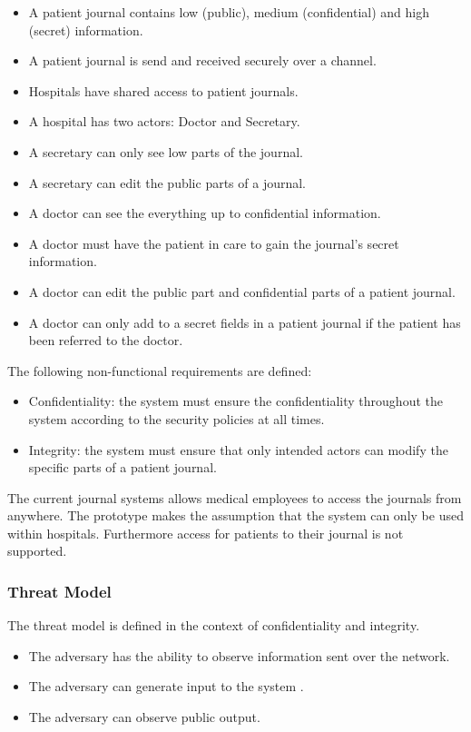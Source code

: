 \begin{itemize}
	\item A patient journal contains low (public), medium (confidential) and high (secret)  information.
	\item A patient journal is send and received securely over a channel.
	\item Hospitals have shared access to patient journals. 
	\item A hospital has two actors: Doctor and Secretary.
	\item A secretary can only see low parts of the journal.
	\item A secretary can edit the public parts of a journal.
	\item A doctor can see the everything up to confidential information.
	\item A doctor must have the patient in care to gain the journal's secret information.
	\item A doctor can edit the public part and confidential parts of a patient journal.
	\item A doctor can only add to a secret fields in a patient journal if the patient has been referred to the doctor.
\end{itemize}

The following non-functional requirements are defined:

\begin{itemize}
	\item Confidentiality: the system must ensure the confidentiality throughout the system according to the security policies at all times.
	\item Integrity: the system must ensure that only intended actors can modify the specific parts of a patient journal.
\end{itemize}

The current journal systems allows medical employees to access the journals from anywhere. The prototype makes the assumption that the system can only be used within hospitals. Furthermore access for patients to their journal is not supported.

\subsubsection{Threat Model}
The threat model is defined in the context of confidentiality and integrity.
\begin{itemize}
	\item The adversary has the ability to observe information sent over the network.
	\item The adversary can generate input to the system .
	\item The adversary can observe public output.   
\end{itemize}

